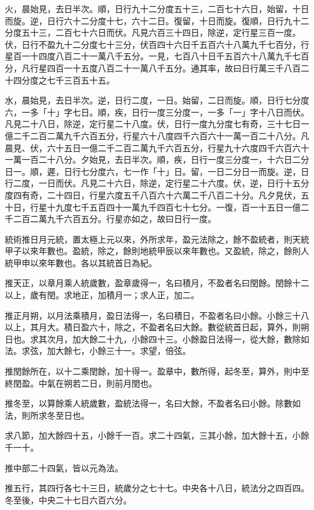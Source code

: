 \begin{pinyinscope}
火，晨始見，去日半次。順，日行九十二分度五十三，二百七十六日，始留，十日而旋。逆，日行六十二分度十七，六十二日。復留，十日而旋。復順，日行九十二分度五十三，二百七十六日而伏。凡見六百三十四日，除逆，定行星三百一度。伏，日行不盈九十二分度七十三分，伏百四十六日千五百六十八萬九千七百分，行星百一十四度八百二十一萬八千五分。一見，七百八十日千五百六十八萬九千七百分，凡行星四百一十五度八百二十一萬八千五分。通其率，故曰日行萬三千八百二十四分度之七千三百五十五。

水，晨始見，去日半次。逆，日行二度，一日。始留，二日而旋。順，日行七分度六，一多「十」字七日。順，疾，日行一度三分度一，一多「一」字十八日而伏。凡見二十八日，除逆，定行星二十八度。伏，日行一度九分度七有奇，三十七日一億二千二百二萬九千六百五分，行星六十八度四千六百六十一萬一百二十八分。凡晨見、伏，六十五日一億二千二百二萬九千六百五分，行星九十六度四千六百六十一萬一百二十八分。夕始見，去日半次。順，疾，日行一度三分度一，十六日二分日一。順，遲，日行七分度六，七一作「十」日。留，一日二分日一而旋。逆，日行二度，一日而伏。凡見二十六日，除逆，定行星二十六度。伏，逆，日行十五分度四有奇，二十四日，行星六度五千八百六十六萬二千八百二十分。凡夕見伏，五十日，行星十九度七千五百四十一萬九千四百七十七分。一復，百一十五日一億二千二百二萬九千六百五分。行星亦如之，故曰日行一度。

統術推日月元統，置太極上元以來，外所求年，盈元法除之，餘不盈統者，則天統甲子以來年數也。盈統，除之，餘則地統甲辰以來年數也。又盈統，除之，餘則人統甲申以來年數也。各以其統首日為紀。

推天正，以章月乘人統歲數，盈章歲得一，名曰積月，不盈者名曰閏餘。閏餘十二以上，歲有閏。求地正，加積月一；求人正，加二。

推正月朔，以月法乘積月，盈日法得一，名曰積日，不盈者名曰小餘。小餘三十八以上，其月大。積日盈六十，除之，不盈者名曰大餘。數從統首日起，算外，則朔日也。求其次月，加大餘二十九，小餘四十三。小餘盈日法得一，從大餘，數除如法。求弦，加大餘七，小餘三十一。求望，倍弦。

推閏餘所在，以十二乘閏餘，加十得一。盈章中，數所得，起冬至，算外，則中至終閏盈。中氣在朔若二日，則前月閏也。

推冬至，以算餘乘人統歲數，盈統法得一，名曰大餘，不盈者名曰小餘。除數如法，則所求冬至日也。

求八節，加大餘四十五，小餘千一百。求二十四氣，三其小餘，加大餘十五，小餘千一十。

推中部二十四氣，皆以元為法。

推五行，其四行各七十三日，統歲分之七十七。中央各十八日，統法分之四百四。冬至後，中央二十七日六百六分。


\end{pinyinscope}
